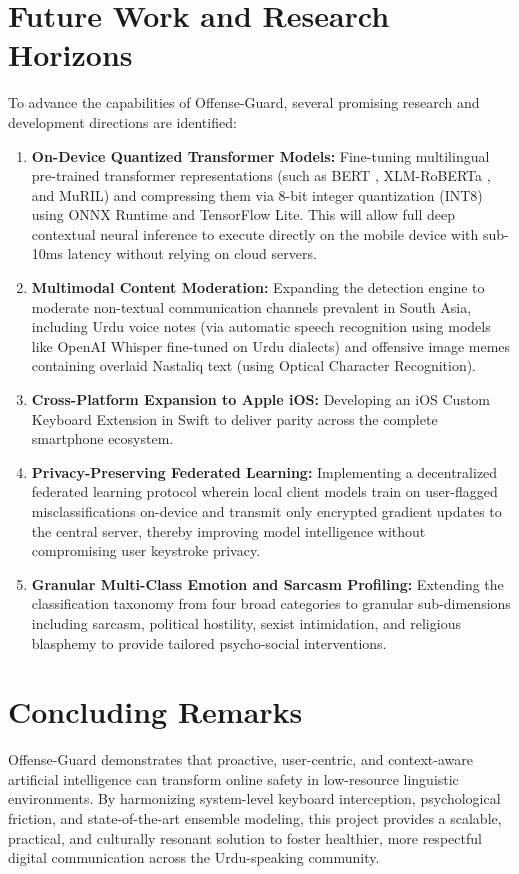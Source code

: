 \documentclass[A4paper,12pt]{report}
\theoremstyle{plain}
\theoremstyle{definition}
\theoremstyle{remark}
\numberwithin{equation}{section}
\begin{document}
\section{Future Work and Research Horizons}
To advance the capabilities of Offense-Guard, several promising research and development directions are identified:
\begin{enumerate}[leftmargin=*]
    \item \textbf{On-Device Quantized Transformer Models:} Fine-tuning multilingual pre-trained transformer representations (such as BERT \cite{ref13}, XLM-RoBERTa \cite{ref14}, and MuRIL) and compressing them via 8-bit integer quantization (INT8) using ONNX Runtime and TensorFlow Lite. This will allow full deep contextual neural inference to execute directly on the mobile device with sub-10ms latency without relying on cloud servers.
    \item \textbf{Multimodal Content Moderation:} Expanding the detection engine to moderate non-textual communication channels prevalent in South Asia, including Urdu voice notes (via automatic speech recognition using models like OpenAI Whisper fine-tuned on Urdu dialects) and offensive image memes containing overlaid Nastaliq text (using Optical Character Recognition).
    \item \textbf{Cross-Platform Expansion to Apple iOS:} Developing an iOS Custom Keyboard Extension in Swift to deliver parity across the complete smartphone ecosystem.
    \item \textbf{Privacy-Preserving Federated Learning:} Implementing a decentralized federated learning protocol wherein local client models train on user-flagged misclassifications on-device and transmit only encrypted gradient updates to the central server, thereby improving model intelligence without compromising user keystroke privacy.
    \item \textbf{Granular Multi-Class Emotion and Sarcasm Profiling:} Extending the classification taxonomy from four broad categories to granular sub-dimensions including sarcasm, political hostility, sexist intimidation, and religious blasphemy to provide tailored psycho-social interventions.
\end{enumerate}

\section{Concluding Remarks}
Offense-Guard demonstrates that proactive, user-centric, and context-aware artificial intelligence can transform online safety in low-resource linguistic environments. By harmonizing system-level keyboard interception, psychological friction, and state-of-the-art ensemble modeling, this project provides a scalable, practical, and culturally resonant solution to foster healthier, more respectful digital communication across the Urdu-speaking community.
\end{document}

